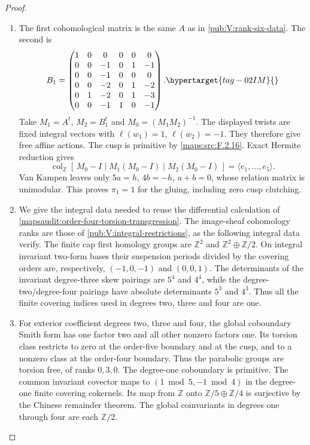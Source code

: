 \documentclass[11pt,a4paper]{article}
\numberwithin{equation}{section}
\theoremstyle{definition}
\begin{document}
\begin{proof}
\begin{enumerate}[label=\arabic*.]
\item The first cohomological matrix is the same $A$ as in
\cref{pub:V:rank-six-data}.  The second is
\begin{equation}
 B_1=\begin{pmatrix}
 1&0&0&0&0&0\\
 0&0&-1&0&1&-1\\
 0&0&-1&0&0&0\\
 0&0&-2&0&1&-2\\
 0&1&-2&0&1&-3\\
 0&0&-1&1&0&-1
 \end{pmatrix}.
 \hypertarget{tag-02IM}{}\label{maps:eq:F.U11}
\end{equation}
Take $M_1=A^t$, $M_2=B_1^t$ and
$M_0=(M_1M_2)^{-1}$.  The displayed twists are fixed integral
vectors with $\ell(w_1)=1$, $\ell(w_2)=-1$.
They therefore give free affine actions.  The cusp is
primitive by \ref{maps:src:F.2.16}.  Exact Hermite reduction gives
\[
 \operatorname{col}_{\mathbb Z}
 [\,M_0-I\mid M_1(M_0-I)\mid M_2(M_0-I)\,]
       =\langle e_1,\ldots,e_5\rangle.
\]
Van Kampen leaves only $5a=h$, $4b=-h$, $a+b=0$,
whose relation matrix is unimodular.  This proves
$\pi_1=1$ for the gluing, including zero cusp
clutching.

\item We give the integral data needed to reuse the differential
calculation of \cref{mapsaudit:order-four-torsion-transgression}.
The image-sheaf cohomology ranks are those of
\cref{pub:V:integral-restrictions}, as the following integral data verify.  The finite cap first homology
groups are $\mathbb Z^2$ and $\mathbb Z^2\oplus\mathbb Z/2$.
On integral invariant two-form bases their suspension periods
divided by the covering orders are, respectively,
$(-1,0,-1)$ and $(0,0,1)$.  The determinants of the invariant
degree-three skew pairings are $5^4$ and $4^4$, while the
degree-two/degree-four pairings have absolute determinants
$5^3$ and $4^3$.  Thus all the finite covering indices used
in degrees two, three and four are one.

\item For exterior coefficient degrees two, three and four, the
global coboundary Smith form has one factor two and all other
nonzero factors one. Its torsion class restricts to zero at the
order-five boundary and at the cusp, and to a nonzero class at
the order-four boundary. Thus the parabolic groups are torsion
free, of ranks $0,3,0$.
The degree-one coboundary is primitive. The common invariant
covector maps to $(1\bmod5,-1\bmod4)$ in the degree-one
finite covering cokernels. Its map from $\mathbb Z$ onto
$\mathbb Z/5\oplus\mathbb Z/4$ is surjective by the Chinese
remainder theorem.  The global coinvariants in degrees one through four
are each $\mathbb Z/2$.


\end{enumerate}
\end{proof}
\end{document}
